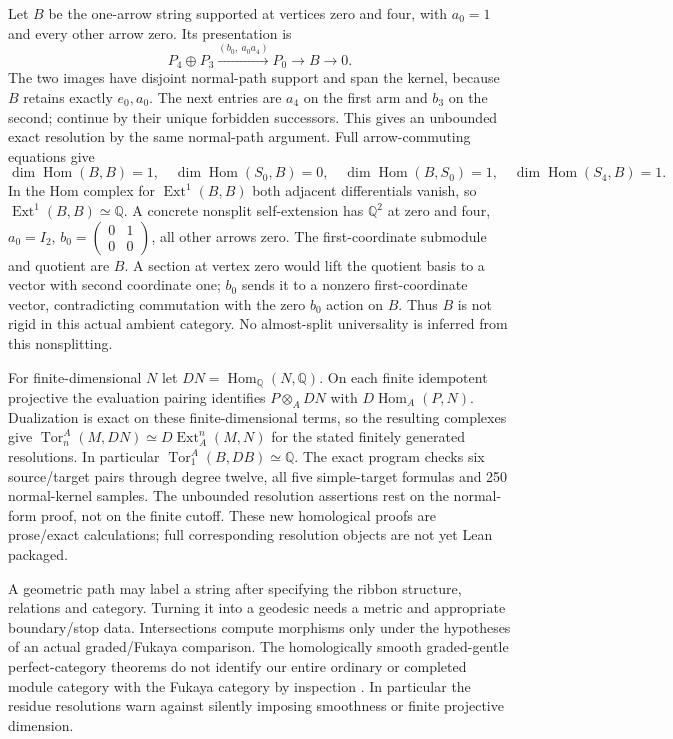 \documentclass[11pt,oneside,openany]{book}
\theoremstyle{definition}\newtheorem{definition}[theorem]{Definition}
\theoremstyle{remark}\newtheorem{remark}[theorem]{Remark}
\begin{document}
Let $B$ be the one-arrow string supported at vertices zero and four, with
$a_0=1$ and every other arrow zero. Its presentation is
\[
 P_4\oplus P_3\xrightarrow{(b_0,\ a_0a_4)}P_0\longrightarrow B\longrightarrow0.
\]
The two images have disjoint normal-path support and span the kernel,
because $B$ retains exactly $e_0,a_0$. The next entries are $a_4$ on the
first arm and $b_3$ on the second; continue by their unique forbidden successors.
This gives an unbounded exact resolution by the same normal-path argument.
Full arrow-commuting equations give
\[
 \dim\operatorname{Hom}(B,B)=1,\quad
 \dim\operatorname{Hom}(S_0,B)=0,\quad
 \dim\operatorname{Hom}(B,S_0)=1,\quad
 \dim\operatorname{Hom}(S_4,B)=1.
\]
In the Hom complex for $\operatorname{Ext}^1(B,B)$ both adjacent
differentials vanish, so $\operatorname{Ext}^1(B,B)\simeq\mathbb Q$.
A concrete nonsplit self-extension has $\mathbb Q^2$ at zero and four,
$a_0=I_2$, $b_0=\left(\begin{smallmatrix}0&1\\0&0\end{smallmatrix}\right)$,
all other arrows zero. The first-coordinate submodule and quotient are $B$.
A section at vertex zero would lift the quotient basis to a vector with
second coordinate one; $b_0$ sends it to a nonzero first-coordinate vector,
contradicting commutation with the zero $b_0$ action on $B$. Thus $B$ is
not rigid in this actual ambient category. No almost-split universality
is inferred from this nonsplitting.

For finite-dimensional $N$ let $DN=\operatorname{Hom}_{\mathbb Q}(N,\mathbb Q)$.
On each finite idempotent projective the evaluation pairing identifies
$P\otimes_A DN$ with $D\operatorname{Hom}_A(P,N)$.
Dualization is exact on these finite-dimensional terms, so the resulting
complexes give
$\operatorname{Tor}^A_n(M,DN)\simeq D\operatorname{Ext}^n_A(M,N)$
for the stated finitely generated resolutions. In particular
$\operatorname{Tor}_1^A(B,DB)\simeq\mathbb Q$.
The exact program checks six source/target pairs through degree twelve,
all five simple-target formulas and 250 normal-kernel samples. The
unbounded resolution assertions rest on the normal-form proof, not on the
finite cutoff. These new homological proofs are prose/exact calculations;
full corresponding resolution objects are not yet Lean packaged.

A geometric path may label a string after specifying the ribbon structure,
relations and category. Turning it into a geodesic needs a metric and
appropriate boundary/stop data. Intersections compute morphisms only under
the hypotheses of an actual graded/Fukaya comparison. The homologically
smooth graded-gentle perfect-category theorems do not identify our entire
ordinary or completed module category with the Fukaya category by inspection
\cite{LFFukaya}. In particular the residue resolutions warn against
silently imposing smoothness or finite projective dimension.
\end{document}
